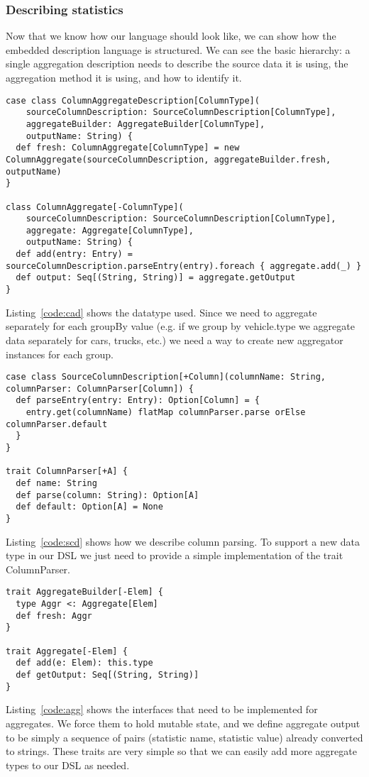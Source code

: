 \subsubsection{Describing statistics}
Now that we know how our language should look like, we can show how the embedded description language is structured.
We can see the basic hierarchy: a single aggregation description needs to describe the source data it is using, the aggregation method it is using, and how to identify it.
\begin{lstlisting}[caption=ColumnAggregateDescription, label=code:cad]
case class ColumnAggregateDescription[ColumnType](
    sourceColumnDescription: SourceColumnDescription[ColumnType],
    aggregateBuilder: AggregateBuilder[ColumnType],
    outputName: String) {
  def fresh: ColumnAggregate[ColumnType] = new ColumnAggregate(sourceColumnDescription, aggregateBuilder.fresh, outputName)
}

class ColumnAggregate[-ColumnType](
    sourceColumnDescription: SourceColumnDescription[ColumnType],
    aggregate: Aggregate[ColumnType],
    outputName: String) {
  def add(entry: Entry) = sourceColumnDescription.parseEntry(entry).foreach { aggregate.add(_) }
  def output: Seq[(String, String)] = aggregate.getOutput
}
\end{lstlisting}
Listing~\ref{code:cad} shows the datatype used.
Since we need to aggregate separately for each groupBy value (e.g. if we group by vehicle.type we aggregate data separately for cars, trucks, etc.) we need a way to create new aggregator instances for each group.

\begin{lstlisting}[caption=SourceColumnDescription, label=code:scd]
case class SourceColumnDescription[+Column](columnName: String, columnParser: ColumnParser[Column]) {
  def parseEntry(entry: Entry): Option[Column] = {
    entry.get(columnName) flatMap columnParser.parse orElse columnParser.default
  }
}

trait ColumnParser[+A] {
  def name: String
  def parse(column: String): Option[A]
  def default: Option[A] = None
}
\end{lstlisting}
Listing~\ref{code:scd} shows how we describe column parsing.
To support a new data type in our DSL we just need to provide a simple implementation of the trait ColumnParser.

\begin{lstlisting}[caption=Aggregate, label=code:agg, float, floatlocation=H]
trait AggregateBuilder[-Elem] {
  type Aggr <: Aggregate[Elem]
  def fresh: Aggr
}

trait Aggregate[-Elem] {
  def add(e: Elem): this.type
  def getOutput: Seq[(String, String)]
}
\end{lstlisting}
Listing~\ref{code:agg} shows the interfaces that need to be implemented for aggregates.
We force them to hold mutable state, and we define aggregate output to be simply a sequence of pairs (statistic name, statistic value) already converted to strings.
These traits are very simple so that we can easily add more aggregate types to our DSL as needed.

